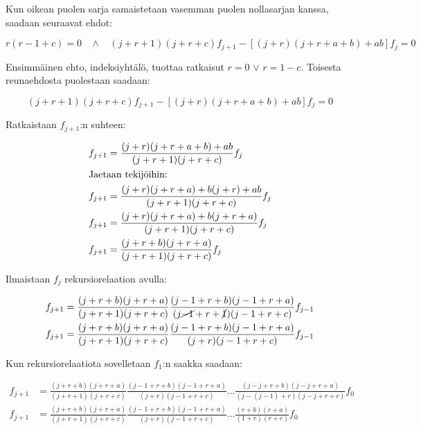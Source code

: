 \documentclass[../johdoksia.tex]{subfiles}
\begin{document}
	\noindent Kun oikean puolen sarja samaistetaan vasemman puolen nollasarjan kanssa, saadaan seuraavat ehdot:
	
	\begin{equation*}
		r(r - 1 + c) = 0 \ \ \ \ \land \ \ \ \ (j + r + 1)(j + r + c)f_{j + 1} - [(j + r)(j + r + a + b ) + ab]f_j = 0
	\end{equation*}

	\noindent Ensimmäinen ehto, indeksiyhtälö, tuottaa ratkaisut $r = 0$ $\lor$ $r = 1 - c$. Toisesta reunaehdosta puolestaan saadaan:
	
	\begin{equation*}
		(j + r + 1)(j + r + c)f_{j + 1} - [(j + r)(j + r + a + b) + ab]f_j = 0
	\end{equation*}

	\noindent Ratkaistaan $f_{j + 1}$:n suhteen:

	\begin{align*}
		f_{j + 1} &= \frac{(j + r)(j + r + a + b) + ab}{(j + r + 1)(j + r + c)}f_j \\
		\intertext{Jaetaan tekijöihin:}
		f_{j + 1} &= \frac{(j + r)(j + r + a) + b(j + r) + ab}{(j + r + 1)(j + r + c)}f_j \\
		f_{j + 1} &= \frac{(j + r)(j + r + a) + b(j + r + a)}{(j + r + 1)(j + r + c)}f_j \\
		f_{j + 1} &= \frac{(j + r + b)(j + r + a)}{(j + r + 1)(j + r + c)}f_j \\
	\end{align*}

	\noindent Ilmaistaan $f_j$ rekursiorelaation avulla:

	\begin{align*}
		f_{j + 1} &= \frac{(j + r + b)(j + r + a)}{(j + r + 1)(j + r + c)}\frac{(j - 1 + r + b)(j - 1 + r + a)}{(j \cancel{- 1} + r + \cancel{1})(j - 1 + r + c)}f_{j - 1}\\
		f_{j + 1} &= \frac{(j + r + b)(j + r + a)}{(j + r + 1)(j + r + c)}\frac{(j - 1 + r + b)(j - 1 + r + a)}{(j + r)(j - 1 + r + c)}f_{j - 1}\\
	\end{align*}

	\noindent Kun rekursiorelaatiota sovelletaan $f_1$:n saakka saadaan:
	
	\begin{align*}
		f_{j + 1} &= \frac{(j + r + b)(j + r + a)}{(j + r + 1)(j + r + c)}\frac{(j - 1 + r + b)(j - 1 + r + a)}{(j + r)(j - 1 + r + c)}\dots\frac{(j - j + r + b)(j - j + r + a)}{(j - (j - 1) + r)(j - j + r + c)}f_{0} \\
		f_{j + 1} &= \frac{(j + r + b)(j + r + a)}{(j + r + 1)(j + r + c)}\frac{(j - 1 + r + b)(j - 1 + r + a)}{(j + r)(j - 1 + r + c)}\dots\frac{(r + b)(r + a)}{(1 + r)(r + c)}f_{0}
	\end{align*}
\end{document}
